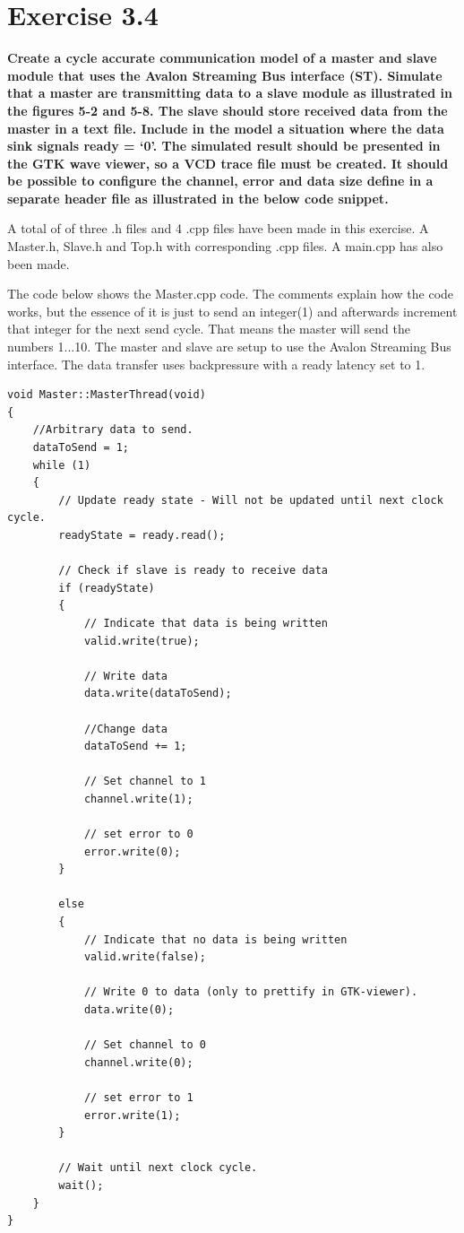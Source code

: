 
\chapter{Exercise 3.4}
\textbf{Create a cycle accurate communication model of a master and slave module that uses the
Avalon Streaming Bus interface (ST). Simulate that a master are transmitting data to a slave
module as illustrated in the figures 5-2 and 5-8. The slave should store received data from the master
in a text file. Include in the model a situation where the data sink signals ready = ‘0’. The simulated result
should be presented in the GTK wave viewer, so a VCD trace file must be created. It should be
possible to configure the channel, error and data size define in a separate header file as illustrated
in the below code snippet.}


A total of of three .h files and 4 .cpp files have been made in this exercise. A Master.h, Slave.h and Top.h with corresponding .cpp files. A main.cpp has also been made. 

The code below shows the Master.cpp code. The comments explain how the code works, but the essence of it is just to send an integer(1) and afterwards increment that integer for the next send cycle. That means the master will send the numbers 1...10. The master and slave are setup to use the Avalon Streaming Bus interface. The data transfer uses backpressure with a ready latency set to 1.  



\begin{lstlisting}
void Master::MasterThread(void)
{
	//Arbitrary data to send.
	dataToSend = 1;
	while (1)
	{
		// Update ready state - Will not be updated until next clock cycle.
		readyState = ready.read();
		
		// Check if slave is ready to receive data
		if (readyState)
		{
			// Indicate that data is being written
			valid.write(true);
			
			// Write data
			data.write(dataToSend);
			
			//Change data
			dataToSend += 1;
			
			// Set channel to 1
			channel.write(1);
			
			// set error to 0
			error.write(0);
		}
		
		else
		{
			// Indicate that no data is being written
			valid.write(false);
			
			// Write 0 to data (only to prettify in GTK-viewer).
			data.write(0);
			
			// Set channel to 0
			channel.write(0);
			
			// set error to 1
			error.write(1);
		}
		
		// Wait until next clock cycle.
		wait();
	}
}
\end{lstlisting}

